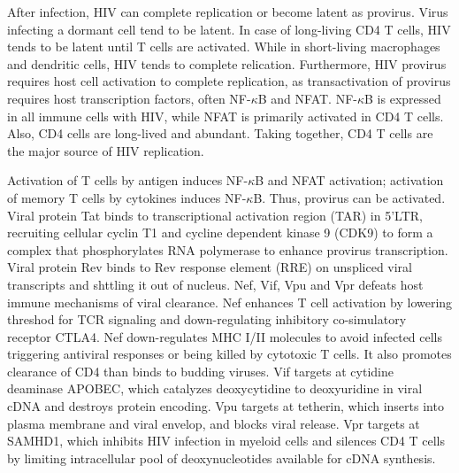 \documentclass[11pt]{article}
\begin{document}
\begin{sloppypar}
After infection, HIV can complete replication or become latent as provirus. 
Virus infecting a dormant cell tend to be latent. 
In case of long-living CD4 T cells, HIV tends to be latent until T cells are activated. 
While in short-living macrophages and dendritic cells, HIV tends to complete relication. 
Furthermore, HIV provirus requires host cell activation to complete replication, as transactivation of provirus requires host transcription factors, often NF-$\kappa$B and NFAT. 
NF-$\kappa$B is expressed in all immune cells with HIV, while NFAT is primarily activated in CD4 T cells. 
Also, CD4 cells are long-lived and abundant. 
Taking together, CD4 T cells are the major source of HIV replication.

\par

Activation of T cells by antigen induces NF-$\kappa$B and NFAT activation; 
activation of memory T cells by cytokines induces NF-$\kappa$B. 
Thus, provirus can be activated. 
Viral protein Tat binds to transcriptional activation region (TAR) in 5'LTR, recruiting cellular cyclin T1 and cycline dependent kinase 9 (CDK9) to form a complex that phosphorylates RNA polymerase to enhance provirus transcription. 
Viral protein Rev binds to Rev response element (RRE) on unspliced viral transcripts and shttling it out of nucleus. 
Nef, Vif, Vpu and Vpr defeats host immune mechanisms of viral clearance. 
Nef enhances T cell activation by lowering threshod for TCR signaling and down-regulating inhibitory co-simulatory receptor CTLA4. 
Nef down-regulates MHC I/II molecules to avoid infected cells triggering antiviral responses or being killed by cytotoxic T cells. 
It also promotes clearance of CD4 than binds to budding viruses. 
Vif targets at cytidine deaminase APOBEC, which catalyzes deoxycytidine to deoxyuridine in viral cDNA and destroys protein encoding. 
Vpu targets at tetherin, which inserts into plasma membrane and viral envelop, and blocks viral release. 
Vpr targets at SAMHD1, which inhibits HIV infection in myeloid cells and silences CD4 T cells by limiting intracellular pool of deoxynucleotides available for cDNA synthesis. 


\end{sloppypar}
\end{document}
